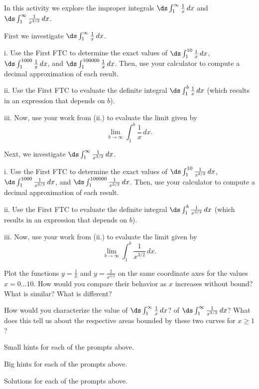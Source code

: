 \begin{activity} \label{A:6.5.1}  In this activity we explore the improper integrals $\ds \int_1^{\infty} \frac{1}{x} \, dx$ and $\ds \int_1^{\infty} \frac{1}{x^{3/2}} \, dx$.
\ba
	\item First we investigate $\ds \int_1^{\infty} \frac{1}{x} \, dx$.
	\be
		\item[i.] Use the First FTC to determine the exact values of $\ds \int_1^{10} \frac{1}{x} \, dx$, $\ds \int_1^{1000} \frac{1}{x} \, dx$, and $\ds \int_1^{100000} \frac{1}{x} \, dx$.  Then, use your calculator to compute a decimal approximation of each result.
		\item[ii.]  Use the First FTC to evaluate the definite integral $\ds \int_1^{b} \frac{1}{x} \, dx$ (which results in an expression that depends on $b$).
		\item[iii.]  Now, use your work from (ii.) to evaluate the limit given by
	$$\lim_{b \to \infty}  \int_1^{b} \frac{1}{x} \, dx.$$
	\ee
	\item Next, we investigate $\ds \int_1^{\infty} \frac{1}{x^{3/2}} \, dx$.
	\be
		\item[i.] Use the First FTC to determine the exact values of $\ds \int_1^{10} \frac{1}{x^{3/2}} \, dx$, $\ds \int_1^{1000} \frac{1}{x^{3/2}} \, dx$, and $\ds \int_1^{100000} \frac{1}{x^{3/2}} \, dx$.  Then, use your calculator to compute a decimal approximation of each result.
		\item[ii.]  Use the First FTC to evaluate the definite integral $\ds \int_1^{b} \frac{1}{x^{3/2}} \, dx$ (which results in an expression that depends on $b$).
		\item[iii.]  Now, use your work from (ii.) to evaluate the limit given by
	$$\lim_{b \to \infty}  \int_1^{b} \frac{1}{x^{3/2}} \, dx.$$
	\ee
	\item Plot the functions $y = \frac{1}{x}$ and $y = \frac{1}{x^{3/2}}$ on the same coordinate axes for the values $x = 0 \ldots 10$.  How would you compare their behavior as $x$ increases without bound?  What is similar?  What is different?
	\item How would you characterize the value of $\ds \int_1^{\infty} \frac{1}{x} \, dx$? of $\ds \int_1^{\infty} \frac{1}{x^{3/2}} \, dx$?  What does this tell us about the respective areas bounded by these two curves for $x \ge 1$?
\ea

\end{activity}
\begin{smallhint}
\ba
	\item Small hints for each of the prompts above.
\ea
\end{smallhint}
\begin{bighint}
\ba
	\item Big hints for each of the prompts above.
\ea
\end{bighint}
\begin{activitySolution}
\ba
	\item Solutions for each of the prompts above.
\ea
\end{activitySolution}
\aftera
